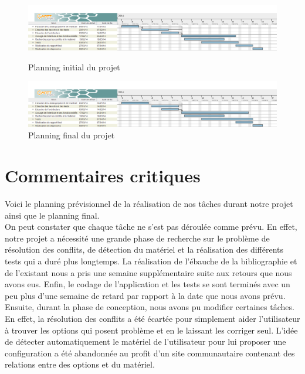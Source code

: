 ﻿\documentclass[17pts]{report}
\begin{document}
\begin{figure}
    \includegraphics[scale=0.5]{./illustrations/planning_initial_pdp.png}
    \centering
    \caption{Planning initial du projet}
    \label{fig:PlanningInitial}
    \vspace{10.00mm}
    \includegraphics[scale=0.5]{./illustrations/planning_final_pdp.png}
    \centering
    \caption{Planning final du projet}
    \label{fig:PlanningFinal}
\end{figure}

\newpage
\chapter*{Commentaires critiques}\thispagestyle{IHA-fancy-style}

Voici le planning prévisionnel de la réalisation de nos tâches durant notre
projet ainsi que le planning final.  \\

On peut constater que chaque tâche ne s'est pas déroulée comme prévu.  En
effet, notre projet a nécessité une grande phase de recherche sur le problème
de résolution des conflits, de détection du matériel et la réalisation des
différents tests qui a duré plus longtemps.  La réalisation de l'ébauche de la
bibliographie et de l'existant nous a pris une semaine supplémentaire suite aux
retours que nous avons eus. Enfin, le codage de l'application et les tests se
sont terminés avec un peu plus d'une semaine de retard par rapport à la date
que nous avons prévu.  \\

Ensuite, durant la phase de conception, nous avons pu modifier certaines
tâches. En effet, la résolution des conflits a été écartée pour simplement
aider l'utilisateur à trouver les options qui posent problème et en le laissant
les corriger seul. L'idée de détecter automatiquement le matériel de
l'utilisateur pour lui proposer une configuration a été abandonnée au profit
d'un site communautaire contenant des relations entre des options et du
matériel.
\end{document}
